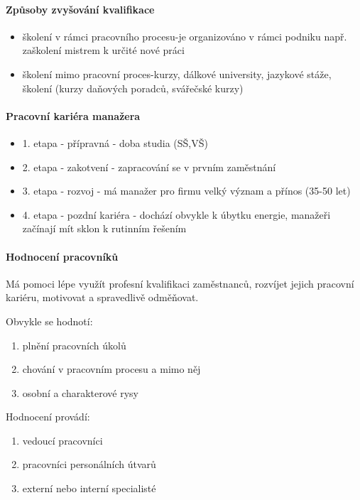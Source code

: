 \paragraph*{Způsoby zvyšování kvalifikace}
\begin{itemize}
    \item školení v rámci pracovního procesu-je organizováno v rámci podniku např. zaškolení mistrem k určité nové práci
    \item školení mimo pracovní proces-kurzy, dálkové university, jazykové stáže, školení (kurzy daňových poradců, svářečské kurzy)
\end{itemize}

\paragraph*{Pracovní kariéra manažera}
\begin{itemize}
    \item 1. etapa - přípravná - doba studia (SŠ,VŠ)
    \item 2. etapa - zakotvení - zapracování se v prvním zaměstnání
    \item 3. etapa - rozvoj - má manažer pro firmu velký význam a přínos (35-50 let)
    \item 4. etapa - pozdní kariéra - dochází obvykle k úbytku energie, manažeři začínají mít sklon k rutinním řešením
\end{itemize}

\paragraph*{Hodnocení pracovníků}
Má pomoci lépe využít profesní kvalifikaci zaměstnanců, rozvíjet jejich pracovní kariéru, motivovat a spravedlivě odměňovat.

Obvykle se hodnotí:
\begin{enumerate}
    \item plnění pracovních úkolů
    \item chování v pracovním procesu a mimo něj
    \item osobní a charakterové rysy
\end{enumerate}

Hodnocení provádí:
\begin{enumerate}
    \item vedoucí pracovníci
    \item pracovníci personálních útvarů
    \item externí nebo interní specialisté
\end{enumerate}

